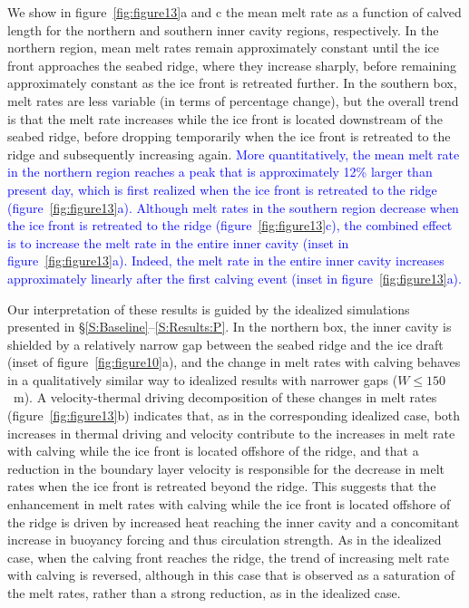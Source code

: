\documentclass[draft]{agujournal2019}
\newcommand{\blue}[1]{\textcolor{blue}{#1}}
\begin{document}
We show in figure~\ref{fig:figure13}a and c the mean melt rate as a function of calved length for the northern and southern inner cavity regions, respectively. In the northern region, mean melt rates remain approximately constant until the ice front approaches the seabed ridge, where they increase sharply, before remaining approximately constant as the ice front is retreated further. In the southern box, melt rates are less variable (in terms of percentage change), but the overall trend is that the melt rate increases while the ice front is located downstream of the seabed ridge, before dropping temporarily when the ice front is retreated to the ridge and subsequently increasing again.  \blue{More quantitatively, the mean melt rate in the northern region reaches a peak that is approximately 12\% larger than present day, which is first realized when the ice front is retreated to the ridge (figure~\ref{fig:figure13}a). Although melt rates in the southern region decrease when the ice front is retreated to the ridge (figure~\ref{fig:figure13}c), the combined effect is to increase the melt rate in the entire inner cavity (inset in figure~\ref{fig:figure13}a). Indeed, the melt rate in the entire inner cavity increases approximately linearly after the first calving event (inset in figure~\ref{fig:figure13}a).}



Our interpretation of these results is guided by the idealized simulations presented in \S\ref{S:Baseline}--\ref{S:Results:P}. In the northern box, the inner cavity is shielded by a relatively narrow gap between the seabed ridge and the ice draft (inset of figure~\ref{fig:figure10}a), and the change in melt rates with calving behaves in a qualitatively similar way to idealized results with narrower gaps ($W\leq150$~m). A velocity-thermal driving decomposition of these changes in melt rates (figure~\ref{fig:figure13}b) indicates that, as in the corresponding idealized case, both increases in thermal driving and velocity contribute to the increases in melt rate with calving while the ice front is located offshore of the ridge, and that a reduction in the boundary layer velocity is responsible for the decrease in melt rates when the ice front is retreated beyond the ridge. This suggests that the enhancement in melt rates with calving while the ice front is located offshore of the ridge is driven by increased heat reaching the inner cavity and a concomitant increase in buoyancy forcing and thus circulation strength. As in the idealized case, when the calving front reaches the ridge, the trend of increasing melt rate with calving is reversed, although in this case that is observed as a saturation of the melt rates, rather than a strong reduction, as in the idealized case.
\end{document}
